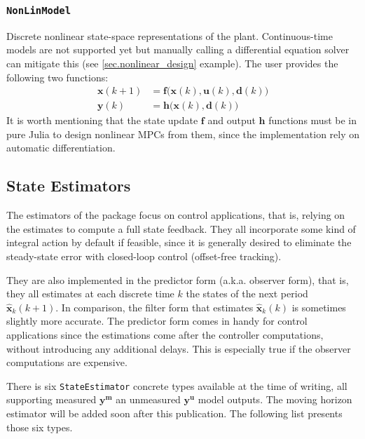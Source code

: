 \subsubsection{\textnormal{\texttt{NonLinModel}}}

Discrete nonlinear  state-space representations of the plant. Continuous-time models are not supported yet but manually calling a differential equation solver can mitigate this (see \cref{sec.nonlinear_design} example). The user provides the following two functions:
\begin{subequations}
\begin{align}
    \mathbf{x}(k+1) &= \mathbf{f}\big(\mathbf{x}(k), \mathbf{u}(k), \mathbf{d}(k)\big) \\
    \mathbf{y}(k)   &= \mathbf{h}\big( \mathbf{x}(k), \mathbf{d}(k) \big)
\end{align}
\end{subequations}
It is worth mentioning that the state update $\mathbf{f}$ and output $\mathbf{h}$ functions must be in pure Julia to design nonlinear MPCs from them, since the implementation rely on automatic differentiation.

\subsection{State Estimators}

The estimators of the package focus on control applications, that is, relying on the estimates to compute a full state feedback. They all incorporate some kind of integral action by default if feasible, since it is generally desired to eliminate the steady-state error with closed-loop control (offset-free tracking).

They are also implemented in the predictor form (a.k.a. observer form), that is, they all estimates at each discrete time $k$ the states of the next period $\mathbf{\hat{x}}_k(k+1)$. In comparison, the filter form that estimates $\mathbf{\hat{x}}_k(k)$ is sometimes slightly more accurate. The predictor form comes in handy for control applications since the estimations come after the controller computations, without introducing any additional delays. This is especially true if the observer computations are expensive.

There is six \texttt{StateEstimator} concrete types available at the time of writing, all supporting measured $\mathbf{y^m}$ an unmeasured $\mathbf{y^u}$ model outputs. The moving horizon estimator will be added soon after this publication. The following list presents those six types.

